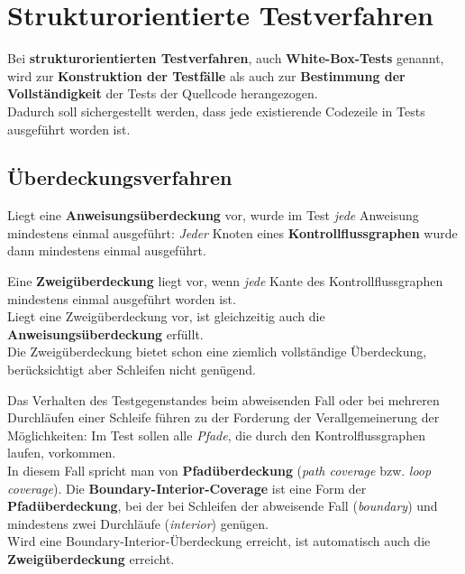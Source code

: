 \section{Strukturorientierte Testverfahren}

\begin{tcolorbox}
    Bei \textbf{strukturorientierten Testverfahren}, auch \textbf{White-Box-Tests} genannt, wird zur \textbf{Konstruktion der Testfälle} als auch zur \textbf{Bestimmung der Vollständigkeit} der Tests der Quellcode herangezogen.\\
    Dadurch soll sichergestellt werden, dass jede existierende Codezeile in Tests ausgeführt worden ist.
\end{tcolorbox}


\subsection*{Überdeckungsverfahren}

\begin{tcolorbox}[title=Anweisungsüberdeckung]
    Liegt eine \textbf{Anweisungsüberdeckung} vor, wurde im Test \textit{jede} Anweisung mindestens einmal ausgeführt: \textit{Jeder} Knoten eines \textbf{Kontrollflussgraphen} wurde dann mindestens einmal ausgeführt.
\end{tcolorbox}

\begin{tcolorbox}[title=Zweigüberdeckung]
    Eine \textbf{Zweigüberdeckung} liegt vor, wenn \textit{jede} Kante des Kontrollflussgraphen mindestens einmal ausgeführt worden ist.\\
    Liegt eine Zweigüberdeckung vor, ist gleichzeitig auch die \textbf{Anweisungsüberdeckung} erfüllt.\\
    Die Zweigüberdeckung bietet schon eine ziemlich vollständige Überdeckung, berücksichtigt aber Schleifen nicht genügend.
\end{tcolorbox}

\begin{tcolorbox}[title=Boundary-Interior-Coverage]
    Das Verhalten des Testgegenstandes beim abweisenden Fall oder bei mehreren Durchläufen einer Schleife führen zu der Forderung der Verallgemeinerung der Möglichkeiten: Im Test sollen alle \textit{Pfade}, die durch den Kontrolflussgraphen laufen, vorkommen.\\
    In diesem Fall spricht man von \textbf{Pfadüberdeckung} (\textit{path coverage} bzw. \textit{loop coverage}).
    Die \textbf{Boundary-Interior-Coverage} ist eine Form der \textbf{Pfadüberdeckung}, bei der bei Schleifen der abweisende Fall (\textit{boundary}) und mindestens zwei Durchläufe (\textit{interior}) genügen.\\
    Wird eine Boundary-Interior-Überdeckung erreicht, ist automatisch auch die \textbf{Zweigüberdeckung} erreicht.
\end{tcolorbox}

